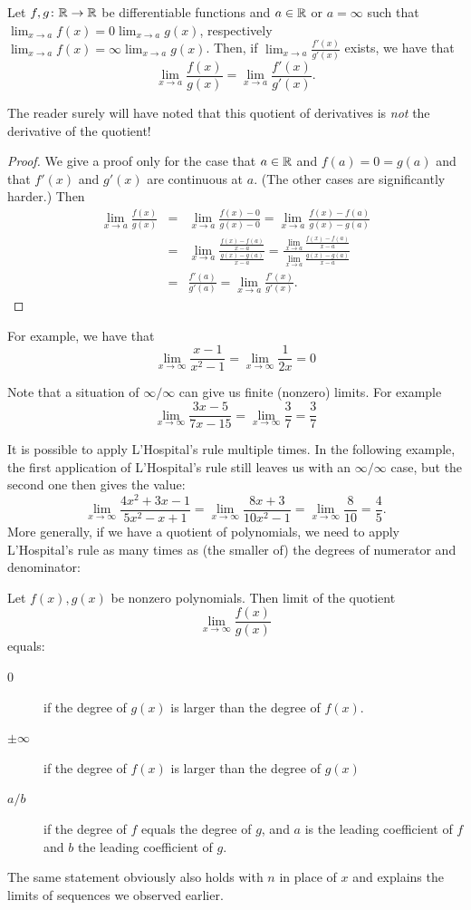 \begin{thm}
Let $f,g\colon{\mathbb R}\to{\mathbb R}$ be differentiable functions and $a\in{\mathbb R}$ or
$a=\infty$ such that $\lim_{x\to a}f(x)=0\lim_{x\to a}g(x)$, respectively
$\lim_{x\to a}f(x)=\infty\lim_{x\to a}g(x)$. Then, if $\lim_{x\to
a}\frac{f'(x)}{g'(x)}$ exists, we have that
\[
\lim_{x\to a}\frac{f(x)}{g(x)}=\lim_{x\to a}\frac{f'(x)}{g'(x)}.
\]
\end{thm}
The reader surely will have noted that this quotient of derivatives is {\em
not} the derivative of the quotient!\\
\begin{proof}
We give a proof only for the case that $a\in{\mathbb R}$ and $f(a)=0=g(a)$ and that
$f'(x)$ and $g'(x)$ are continuous at $a$. (The other cases are
significantly harder.) Then
\begin{eqnarray*}
\lim_{x\to a}\frac{f(x)}{g(x)}
&=&\lim_{x\to a}\frac{f(x)-0}{g(x)-0}
=\lim_{x\to a}\frac{f(x)-f(a)}{g(x)-g(a)}\\
&=&\lim_{x\to a}\frac{\frac{f(x)-f(a)}{x-a}}{\frac{g(x)-g(a)}{x-a}}
=
\frac{\lim_{x\to a}\frac{f(x)-f(a)}{x-a}}{\lim_{x\to
a}\frac{g(x)-g(a)}{x-a}}\\
&=&\frac{f'(a)}{g'(a)}=\lim_{x\to a}\frac{f'(x)}{g'(x)}.
\end{eqnarray*}
\end{proof}

For example, we have that
\[
\lim_{x\to\infty}\frac{x-1}{x^2-1}=
\lim_{x\to\infty}\frac{1}{2x}=0
\]

Note that a situation of $\infty/\infty$ can give us finite (nonzero)
limits. For example
\[
\lim_{x\to\infty}\frac{3x-5}{7x-15}=
\lim_{x\to\infty}\frac{3}{7}=\frac{3}{7}
\]

It is possible to apply L'Hospital's rule multiple times. In the following
example, the first application of L'Hospital's rule still leaves us with an
$\infty/\infty$ case, but the second one then gives the value:
\[
\lim_{x\to\infty}\frac{4x^2+3x-1}{5x^2-x+1}
=\lim_{x\to\infty}\frac{8x+3}{10x^2-1}
=\lim_{x\to\infty}\frac{8}{10}=\frac{4}{5}.
\]
More generally, if we have a quotient of polynomials, we need to apply
L'Hospital's rule as many times as (the smaller of) the degrees of numerator
and denominator:
\begin{thm}
Let $f(x),g(x)$ be nonzero polynomials. Then limit of the quotient
\[
\lim_{x\to\infty}\frac{f(x)}{g(x)}
\]
equals:
\begin{description}
\item[$0$] if the degree of $g(x)$ is larger than the degree of $f(x)$.\\
\item[$\pm\infty$] if the degree of $f(x)$ is larger than the degree of
$g(x)$\\
\item[$a/b$] if the degree of $f$ equals the degree of $g$, and $a$ is the
leading coefficient of $f$ and $b$ the leading coefficient of $g$.
\end{description}
\end{thm}
The same statement obviously also holds with $n$ in place of $x$ and
explains the limits of sequences we observed earlier.

